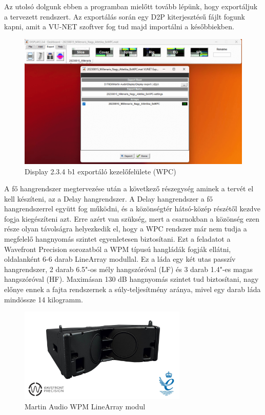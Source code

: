 Az utolsó dolgunk ebben a programban mielőtt tovább lépünk, hogy exportáljuk a tervezett rendszert.
Az exportálás során egy D2P kiterjesztésű fájlt fogunk kapni, amit a VU-NET szoftver fog tud majd importálni a későbbiekben.
\begin{figure}[H]
	\centering
	\includegraphics[width=\textwidth, keepaspectratio]{figures/display_wpc_7.png}
	\caption{Display 2.3.4 b1 exportáló kezelőfelülete (WPC)}\label{fig:display_wpc_7}
\end{figure}
A fő hangrendszer megtervezése után a következő részegység aminek a tervét el kell készíteni, az a Delay hangrendszer.
A Delay hangrendszer a fő hangrendszerrel együtt fog működni, és a közönségtér hátsó-közép részétől kezdve fogja kiegészíteni azt.
Erre azért van szükség, mert a csarnokban a közönség ezen része olyan távolságra helyezkedik el, hogy
a WPC rendszer már nem tudja a megfelelő hangnyomás szintet egyenletesen biztosítani.
Ezt a feladatot a Wavefront Precision sorozatból a WPM típusú hangládák fogják ellátni, oldalanként 6-6 darab LineArray modullal.
Ez a láda egy két utas passzív hangrendszer, 2 darab 6.5"-os mély hangszóróval (LF) és 3 darab 1.4"-es magas hangszóróval (HF). 
Maximásan 130 dB hangnyomás szintet tud biztosítani, nagy előnye ennek a fajta rendszernek a súly-teljesítmény aránya, mivel egy
darab láda mindössze 14 kilogramm.~\cite{WPMUSERGUIDE}
\begin{figure}[H]
	\centering
	\includegraphics[width=80mm, keepaspectratio]{figures/wpm_front_view.jpg}
	\caption{Martin Audio WPM LineArray modul}\label{fig:wpm}
\end{figure}
